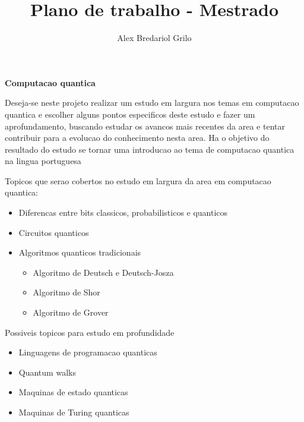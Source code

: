 \documentclass[a4paper,10pt]{article}
\title{Plano de trabalho - Mestrado}
\author{Alex Bredariol Grilo}
\begin{document}
\maketitle

\textbf{Computacao quantica}

Deseja-se neste projeto realizar um estudo em largura nos temas em computacao quantica e
escolher alguns pontos especificos deste estudo e fazer um aprofundamento, buscando
estudar os avancos mais recentes da area e tentar contribuir para a
evolucao do conhecimento nesta area. Ha o objetivo do resultado do estudo se tornar uma introducao ao tema de computacao
quantica na lingua portuguesa

Topicos que serao cobertos no estudo em largura da area em computacao quantica:
\begin{itemize}
\item Diferencas entre bits classicos, probabilisticos e quanticos
\item Circuitos quanticos
\item Algoritmos quanticos tradicionais
 \begin{itemize}
 \item Algoritmo de Deutsch e Deutsch-Josza
 \item Algoritmo de Shor
 \item Algoritmo de Grover
 \end{itemize}
\end{itemize}

Possiveis topicos para estudo em profundidade
\begin{itemize}
\item Linguagens de programacao quanticas
\item Quantum walks
\item Maquinas de estado quanticas
\item Maquinas de Turing quanticas
\end{itemize}
\end{document}
